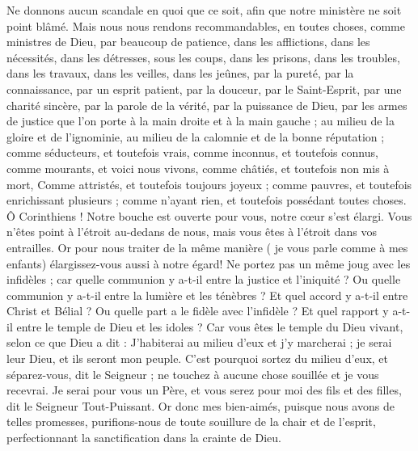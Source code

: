 \begin{multicols}{2}
Ne donnons aucun scandale en quoi que ce soit, afin que notre ministère ne soit point blâmé.
Mais nous nous rendons recommandables, en toutes choses, comme ministres de Dieu, par beaucoup de patience, dans les afflictions, dans les nécessités, dans les détresses,
sous les coups, dans les prisons, dans les troubles, dans les travaux, dans les veilles, dans les jeûnes,
par la pureté, par la connaissance, par un esprit patient, par la douceur, par le Saint-Esprit, par une charité sincère,
par la parole de la vérité, par la puissance de Dieu, par les armes de justice que l'on porte à la main droite et à la main gauche ;
au milieu de la gloire et de l'ignominie, au milieu de la calomnie et de la bonne réputation ; comme séducteurs, et toutefois vrais,
comme inconnus, et toutefois connus, comme mourants, et voici nous vivons, comme châtiés, et toutefois non mis à mort,
Comme attristés, et toutefois toujours joyeux ; comme pauvres, et toutefois enrichissant plusieurs ; comme n'ayant rien, et toutefois possédant toutes choses.
Ô Corinthiens ! Notre bouche est ouverte pour vous, notre cœur s'est élargi.
Vous n'êtes point à l'étroit au-dedans de nous, mais vous êtes à l'étroit dans vos entrailles.
Or pour nous traiter de la même manière ( je vous parle comme à mes enfants) élargissez-vous aussi à notre égard!
Ne portez pas un même joug avec les infidèles ; car quelle communion y a-t-il entre la justice et l'iniquité ? Ou quelle communion y a-t-il entre la lumière et les ténèbres ?
Et quel accord y a-t-il entre Christ et Bélial ? Ou quelle part a le fidèle avec l'infidèle ?
Et quel rapport y a-t-il entre le temple de Dieu et les idoles ? Car vous êtes le temple du Dieu vivant, selon ce que Dieu a dit : J'habiterai au milieu d'eux et j'y marcherai ; je serai leur Dieu, et ils seront mon peuple.
C'est pourquoi sortez du milieu d'eux, et séparez-vous, dit le Seigneur ; ne touchez à aucune chose souillée et je vous recevrai.
Je serai pour vous un Père, et vous serez pour moi des fils et des filles, dit le Seigneur Tout-Puissant.
\VerseOne{}Or donc mes bien-aimés, puisque nous avons de telles promesses, purifions-nous de toute souillure de la chair et de l'esprit, perfectionnant la sanctification dans la crainte de Dieu.

\end{multicols}
